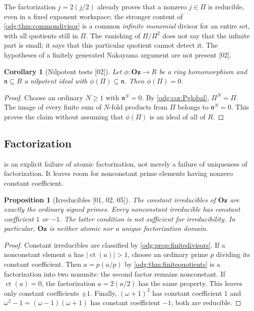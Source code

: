 \documentclass[11pt,oneside]{article}
\numberwithin{equation}{section}
\newtheorem{proposition}[proposition]{Proposition}
\newtheorem{corollary}[corollary]{Corollary}
\theoremstyle{definition}
\theoremstyle{remark}
\newcommand{\Oz}{\mathbf{Oz}}
\newcommand{\ct}{\operatorname{ct}}
\newcommand{\src}[1]{\textup{\textsf{\small[#1]}}}
\begin{document}
The factorization $j=2(j/2)$ already proves that a nonzero $j\in\Pi$ is
reducible, even in a fixed exponent workspace; the stronger content of
\cref{odg:thm:commondivisor} is a common \emph{infinite monomial} divisor for
an entire set, with all quotients still in $\Pi$. The vanishing of
$\Pi/\Pi^2$ does not say that the infinite part is small; it says that this
particular quotient cannot detect it. The hypotheses of a finitely generated
Nakayama argument are not present \src{02}.

\begin{corollary}[Nilpotent tests \src{02}]\label{odg:cor:nilpotent}
Let $\phi:\Oz\to R$ be a ring homomorphism and $\mathfrak n\subseteq R$ a
nilpotent ideal with $\phi(\Pi)\subseteq\mathfrak n$. Then $\phi(\Pi)=0$.
\end{corollary}
\begin{proof}
Choose an ordinary $N\ge1$ with $\mathfrak n^N=0$. By
\cref{odg:cor:Pglobal}, $\Pi^N=\Pi$. The image of every finite sum of
$N$-fold products from $\Pi$ belongs to $\mathfrak n^N=0$. This proves the
claim without assuming that $\phi(\Pi)$ is an ideal of all of $R$.
\end{proof}

\subsection{Factorization}\label{odg:sub:factorization}

 is an explicit failure of atomic factorization, not
merely a failure of uniqueness of factorization. It leaves room for
nonconstant prime elements having nonzero constant coefficient.

\begin{proposition}[Irreducibles \src{01, 02, 05}]\label{odg:prop:irreduciblect}
The constant irreducibles of $\Oz$ are exactly the ordinary signed primes.
Every nonconstant irreducible has constant coefficient $1$ or $-1$.
The latter condition is not sufficient for irreducibility. In particular,
$\Oz$ is neither atomic nor a unique factorization domain.
\end{proposition}
\begin{proof}
Constant irreducibles are classified by \cref{odg:prop:finitedivisors}. If a
nonconstant element $a$ has $|\ct(a)|>1$, choose an ordinary prime $p$
dividing its constant coefficient. Then $a=p(a/p)$ by
\cref{odg:thm:finitequotients} is a factorization into two nonunits: the
second factor remains nonconstant. If $\ct(a)=0$, the factorization
$a=2(a/2)$ has the same property. This leaves only constant coefficients
$\pm1$. Finally, $(\omega+1)^2$ has constant coefficient $1$ and
$\omega^2-1=(\omega-1)(\omega+1)$ has constant coefficient $-1$; both are
reducible.
\end{proof}
\end{document}
